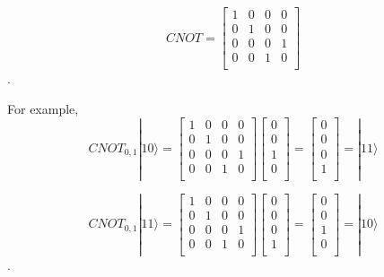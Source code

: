 \begin{equation}
CNOT = \begin{bmatrix}
1 & 0 & 0 & 0 \\
0 & 1 & 0 & 0 \\
0 & 0 & 0 & 1 \\
0 & 0 & 1 & 0 \\
\end{bmatrix}
\end{equation}.

For example,
\begin{equation}
CNOT_{0,1}|10\rangle = 
\begin{bmatrix}
1 & 0 & 0 & 0 \\
0 & 1 & 0 & 0 \\
0 & 0 & 0 & 1 \\
0 & 0 & 1 & 0 \\
\end{bmatrix}
 \left[
\begin{array}{c}
0 \\
0 \\
1 \\
0 \\
\end{array}
\right]
=  \left[
\begin{array}{c}
0 \\
0 \\
0 \\
1 \\
\end{array}
\right] 
= |11\rangle 
\end{equation}

\begin{equation}
CNOT_{0,1}|11\rangle = 
\begin{bmatrix}
1 & 0 & 0 & 0 \\
0 & 1 & 0 & 0 \\
0 & 0 & 0 & 1 \\
0 & 0 & 1 & 0 \\
\end{bmatrix}
 \left[
\begin{array}{c}
0 \\
0 \\
0 \\
1 \\
\end{array}
\right]
=  \left[
\begin{array}{c}
0 \\
0 \\
1 \\
0 \\
\end{array}
\right] 
= |10\rangle 
\end{equation}.


